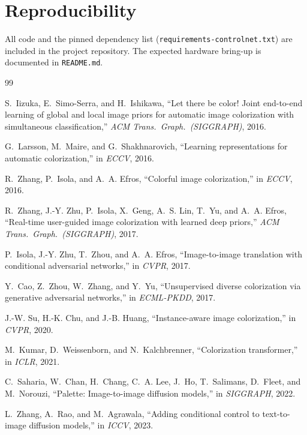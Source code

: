\documentclass[conference]{IEEEtran}
\begin{document}
\section*{Reproducibility}
All code and the pinned dependency list
(\texttt{requirements-controlnet.txt}) are included in the project
repository. The expected hardware bring-up is documented in
\texttt{README.md}.

\begin{thebibliography}{99}

S.~Iizuka, E.~Simo-Serra, and H.~Ishikawa,
``Let there be color! Joint end-to-end learning of global and local image
priors for automatic image colorization with simultaneous classification,''
\emph{ACM Trans.\ Graph.\ (SIGGRAPH)}, 2016.

G.~Larsson, M.~Maire, and G.~Shakhnarovich,
``Learning representations for automatic colorization,''
in \emph{ECCV}, 2016.

R.~Zhang, P.~Isola, and A.~A. Efros,
``Colorful image colorization,'' in \emph{ECCV}, 2016.

R.~Zhang, J.-Y. Zhu, P.~Isola, X.~Geng, A.~S. Lin, T.~Yu, and
A.~A. Efros, ``Real-time user-guided image colorization with learned deep
priors,'' \emph{ACM Trans.\ Graph.\ (SIGGRAPH)}, 2017.

P.~Isola, J.-Y. Zhu, T.~Zhou, and A.~A. Efros,
``Image-to-image translation with conditional adversarial networks,''
in \emph{CVPR}, 2017.

Y.~Cao, Z.~Zhou, W.~Zhang, and Y.~Yu,
``Unsupervised diverse colorization via generative adversarial networks,''
in \emph{ECML-PKDD}, 2017.

J.-W. Su, H.-K. Chu, and J.-B. Huang,
``Instance-aware image colorization,'' in \emph{CVPR}, 2020.

M.~Kumar, D.~Weissenborn, and N.~Kalchbrenner,
``Colorization transformer,'' in \emph{ICLR}, 2021.

C.~Saharia, W.~Chan, H.~Chang, C.~A. Lee, J.~Ho, T.~Salimans,
D.~Fleet, and M.~Norouzi,
``Palette: Image-to-image diffusion models,'' in \emph{SIGGRAPH}, 2022.

L.~Zhang, A.~Rao, and M.~Agrawala,
``Adding conditional control to text-to-image diffusion models,''
in \emph{ICCV}, 2023.


\end{thebibliography}
\end{document}
